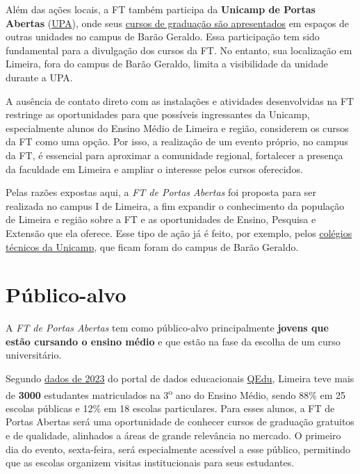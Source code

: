 \documentclass[
  letterpaper,
  DIV=11,
  numbers=noendperiod]{scrreprt}
\begin{document}
Além das ações locais, a FT também participa da \textbf{Unicamp de
Portas Abertas} (\href{https://upa.unicamp.br/}{UPA}), onde seus
\href{https://wordpress.ft.unicamp.br/upa/}{cursos de graduação são
apresentados} em espaços de outras unidades no campus de Barão Geraldo.
Essa participação tem sido fundamental para a divulgação dos cursos da
FT. No entanto, sua localização em Limeira, fora do campus de Barão
Geraldo, limita a visibilidade da unidade durante a UPA.

A ausência de contato direto com as instalações e atividades
desenvolvidas na FT restringe as oportunidades para que possíveis
ingressantes da Unicamp, especialmente alunos do Ensino Médio de Limeira
e região, considerem os cursos da FT como uma opção. Por isso, a
realização de um evento próprio, no campus da FT, é essencial para
aproximar a comunidade regional, fortalecer a presença da faculdade em
Limeira e ampliar o interesse pelos cursos oferecidos.

Pelas razões expostas aqui, a \emph{FT de Portas Abertas} foi proposta
para ser realizada no campus I de Limeira, a fim expandir o conhecimento
da população de Limeira e região sobre a FT e as oportunidades de
Ensino, Pesquisa e Extensão que ela oferece. Esse tipo de ação já é
feito, por exemplo, pelos
\href{https://unicamp.br/noticias/2024/07/24/colegios-tecnicos-da-unicamp-abrem-portas-para-novos-estudantes/}{colégios
técnicos da Unicamp}, que ficam foram do campus de Barão Geraldo.

\section{Público-alvo}\label{puxfablico-alvo}

A \emph{FT de Portas Abertas} tem como público-alvo principalmente
\textbf{jovens que estão cursando o ensino médio} e que estão na fase da
escolha de um curso universitário.

Segundo
\href{https://qedu.org.br/municipio/3526902-limeira/censo-escolar}{dados
de 2023} do portal de dados educacionais
\href{https://qedu.org.br/}{QEdu}, Limeira teve mais de \textbf{3000}
estudantes matriculados na 3\textsuperscript{o} ano do Ensino Médio,
sendo 88\% em 25 escolas públicas e 12\% em 18 escolas particulares.
Para esses alunos, a FT de Portas Abertas será uma oportunidade de
conhecer cursos de graduação gratuitos e de qualidade, alinhados a áreas
de grande relevância no mercado. O primeiro dia do evento, sexta-feira,
será especialmente acessível a esse público, permitindo que as escolas
organizem visitas institucionais para seus estudantes.
\end{document}
